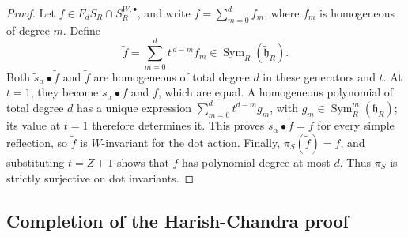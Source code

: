 \documentclass[twoside,a4paper,12pt,reqno]{amsart}
\theoremstyle{remark}
\numberwithin{equation}{section}
\newcommand{\fh}{\mathfrak h}
\DeclareMathOperator{\Sym}{Sym}
\begin{document}
\begin{proof}
Let \(f\in F_dS_R\cap S_R^{W,\bullet}\), and write
\(f=\sum_{m=0}^d f_m\), where \(f_m\) is homogeneous of degree \(m\).
Define
\begin{equation}\label{eq:rho-homogenization}
\widetilde f=\sum_{m=0}^d t^{\,d-m}f_m
\in\Sym_R(\widetilde{\fh}_R).
\end{equation}
Both \(\widetilde s_\alpha\bullet\widetilde f\) and \(\widetilde f\)
are homogeneous of total degree \(d\) in these generators and \(t\).
At \(t=1\), they become \(s_\alpha\bullet f\) and \(f\), which are equal.
A homogeneous polynomial of total degree \(d\) has a unique expression
\(\sum_{m=0}^d t^{d-m}g_m\), with \(g_m\in\Sym_R^m(\fh_R)\);
its value at \(t=1\) therefore determines it. This proves
\(\widetilde s_\alpha\bullet\widetilde f=\widetilde f\) for every
simple reflection, so \(\widetilde f\) is \(W\)-invariant for the dot action.
Finally, \(\pi_S(\widetilde f)=f\), and substituting \(t=Z+1\)
shows that \(\widetilde f\) has polynomial degree at most \(d\).
Thus \(\pi_S\) is strictly surjective on dot invariants.
\end{proof}

\subsection{Completion of the Harish-Chandra proof}
\end{document}
